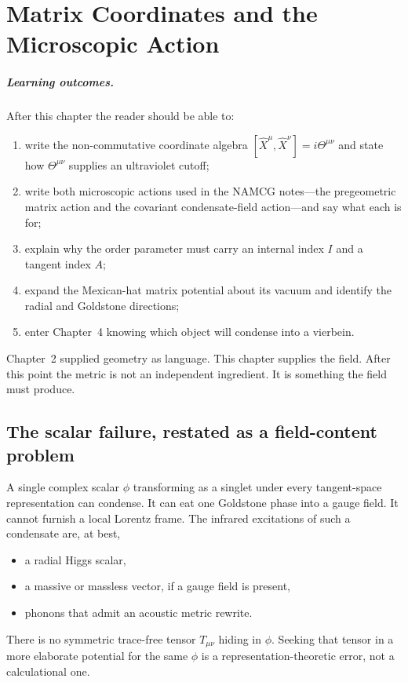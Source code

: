 \chapter[The microscopic action]{Matrix Coordinates and the Microscopic Action}
\label{ch:matrix-action}

\paragraph{Learning outcomes.}
After this chapter the reader should be able to:
\begin{enumerate}
  \item write the non-commutative coordinate algebra
        \([\hat X^\mu,\hat X^\nu]=i\Theta^{\mu\nu}\) and state how
        \(\Theta^{\mu\nu}\) supplies an ultraviolet cutoff;
  \item write both microscopic actions used in the NAMCG notes---the
        pregeometric matrix action and the covariant condensate-field
        action---and say what each is for;
  \item explain why the order parameter must carry an internal index
        \(I\) and a tangent index \(A\);
  \item expand the Mexican-hat matrix potential about its vacuum and
        identify the radial and Goldstone directions;
  \item enter Chapter~4 knowing which object will condense into a
        vierbein.
\end{enumerate}

Chapter~2 supplied geometry as language. This chapter supplies the
field. After this point the metric is not an independent ingredient.
It is something the field must produce.

\section{The scalar failure, restated as a field-content problem}
\label{sec:ch3-scalar-failure}

A single complex scalar \(\phi\) transforming as a singlet under every
tangent-space representation can condense. It can eat one Goldstone
phase into a gauge field. It cannot furnish a local Lorentz frame.
The infrared excitations of such a condensate are, at best,
\begin{itemize}
  \item a radial Higgs scalar,
  \item a massive or massless vector, if a gauge field is present,
  \item phonons that admit an acoustic metric rewrite.
\end{itemize}
There is no symmetric trace-free tensor \(T_{\mu\nu}\) hiding in
\(\phi\). Seeking that tensor in a more elaborate potential for the
same \(\phi\) is a representation-theoretic error, not a calculational
one.

